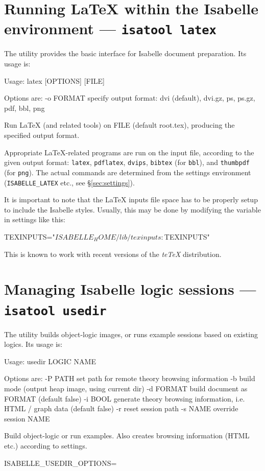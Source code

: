 \section{Running {\LaTeX} within the Isabelle environment --- \texttt{isatool latex}}
\label{sec:tool-latex}

The  utility provides the basic interface for Isabelle document
preparation.  Its usage is:
\begin{ttbox}
Usage: latex [OPTIONS] [FILE]

  Options are:
    -o FORMAT    specify output format: dvi (default), dvi.gz, ps,
                 ps.gz, pdf, bbl, png

  Run LaTeX (and related tools) on FILE (default root.tex),
  producing the specified output format.
\end{ttbox}
Appropriate {\LaTeX}-related programs are run on the input file, according to
the given output format: \texttt{latex}, \texttt{pdflatex}, \texttt{dvips},
\texttt{bibtex} (for \texttt{bbl}), and \texttt{thumbpdf} (for \texttt{png}).
The actual commands are determined from the settings environment
(\texttt{ISABELLE_LATEX} etc., see \S\ref{sec:settings}).

It is important to note that the {\LaTeX} inputs file space has to be properly
setup to include the Isabelle styles.  Usually, this may be done by modifying
the  variable in settings like this:
\begin{ttbox}
TEXINPUTS="$ISABELLE_HOME/lib/texinputs:$TEXINPUTS"
\end{ttbox}
This is known to work with recent versions of the \textsl{teTeX} distribution.



\section{Managing Isabelle logic sessions --- \texttt{isatool usedir}} \label{sec:tool-usedir}

The  utility builds object-logic images, or runs example
sessions based on existing logics. Its usage is:
\begin{ttbox}
Usage: usedir LOGIC NAME

  Options are:
    -P PATH      set path for remote theory browsing information
    -b           build mode (output heap image, using current dir)
    -d FORMAT    build document as FORMAT (default false)
    -i BOOL      generate theory browsing information,
                 i.e. HTML / graph data (default false)
    -r           reset session path
    -s NAME      override session NAME

  Build object-logic or run examples. Also creates browsing
  information (HTML etc.) according to settings.

  ISABELLE_USEDIR_OPTIONS=
\end{ttbox}

